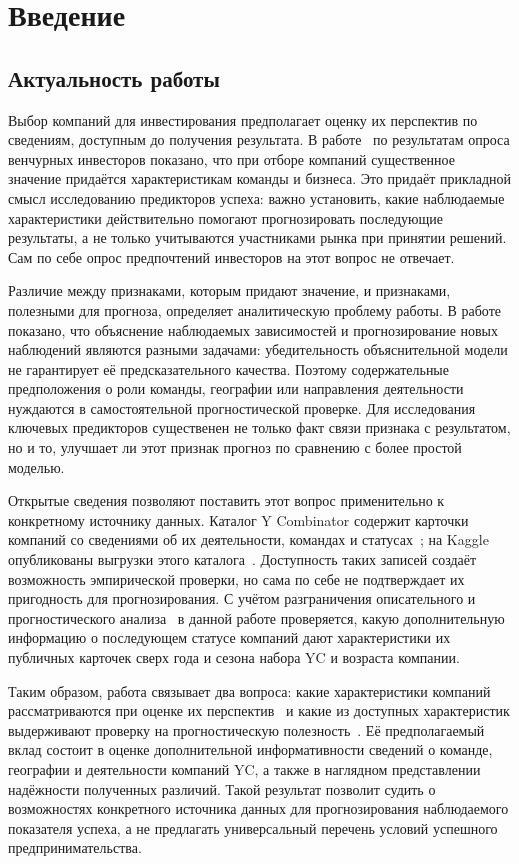 \section{Введение}

\subsection{Актуальность работы}

Выбор компаний для инвестирования предполагает оценку их перспектив по сведениям, доступным до получения результата. В работе~\cite{gompers2016} по результатам опроса венчурных инвесторов показано, что при отборе компаний существенное значение придаётся характеристикам команды и бизнеса. Это придаёт прикладной смысл исследованию предикторов успеха: важно установить, какие наблюдаемые характеристики действительно помогают прогнозировать последующие результаты, а не только учитываются участниками рынка при принятии решений. Сам по себе опрос предпочтений инвесторов на этот вопрос не отвечает.

Различие между признаками, которым придают значение, и признаками, полезными для прогноза, определяет аналитическую проблему работы. В работе~\cite{shmueli2010} показано, что объяснение наблюдаемых зависимостей и прогнозирование новых наблюдений являются разными задачами: убедительность объяснительной модели не гарантирует её предсказательного качества. Поэтому содержательные предположения о роли команды, географии или направления деятельности нуждаются в самостоятельной прогностической проверке. Для исследования ключевых предикторов существенен не только факт связи признака с результатом, но и то, улучшает ли этот признак прогноз по сравнению с более простой моделью.

Открытые сведения позволяют поставить этот вопрос применительно к конкретному источнику данных. Каталог Y Combinator содержит карточки компаний со сведениями об их деятельности, командах и статусах~\cite{yc-directory}; на Kaggle опубликованы выгрузки этого каталога~\cite{kaggle-yc-dataset1,kaggle-yc-dataset2}. Доступность таких записей создаёт возможность эмпирической проверки, но сама по себе не подтверждает их пригодность для прогнозирования. С учётом разграничения описательного и прогностического анализа~\cite{shmueli2010} в данной работе проверяется, какую дополнительную информацию о последующем статусе компаний дают характеристики их публичных карточек сверх года и сезона набора YC и возраста компании.

Таким образом, работа связывает два вопроса: какие характеристики компаний рассматриваются при оценке их перспектив~\cite{gompers2016} и какие из доступных характеристик выдерживают проверку на прогностическую полезность~\cite{shmueli2010}. Её предполагаемый вклад состоит в оценке дополнительной информативности сведений о команде, географии и деятельности компаний YC, а также в наглядном представлении надёжности полученных различий. Такой результат позволит судить о возможностях конкретного источника данных для прогнозирования наблюдаемого показателя успеха, а не предлагать универсальный перечень условий успешного предпринимательства.

